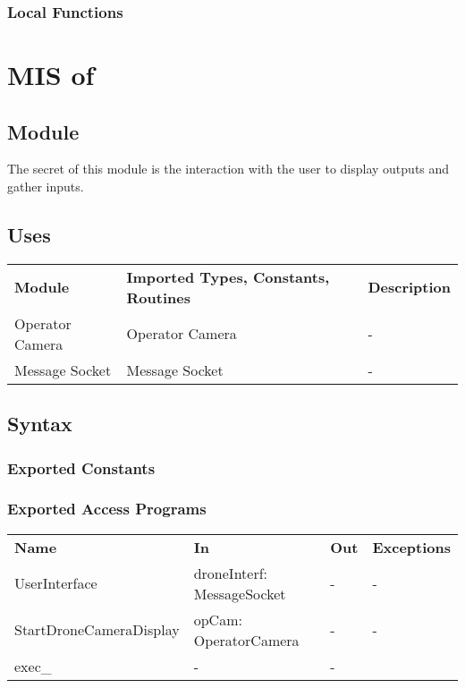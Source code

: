 \documentclass[12pt, titlepage]{article}
\begin{document}
\subsubsection{Local Functions}
\newpage

\section{MIS of } \label{MIS_USER_INTERFACE} 
\subsection{Module}
The secret of this module is the interaction with the user to display outputs and gather inputs.
\subsection{Uses}
\begin{center}
\begin{tabular}{p{2 cm} p{5cm} p{6.5cm} } 
\hline
\textbf{Module} & \textbf{Imported Types, Constants, Routines} & \textbf{Description} \\
Operator Camera & Operator Camera & - \\
Message Socket & Message Socket & - \\
\hline
\hline
\end{tabular}
\end{center}
\subsection{Syntax}
\subsubsection{Exported Constants}
\subsubsection{Exported Access Programs}
\begin{center}
\begin{tabular}{p{5.5cm} p{3.5cm} p{2.5cm} p{2cm}}
\hline
\textbf{Name} & \textbf{In} & \textbf{Out} & \textbf{Exceptions} \\
UserInterface & droneInterf: MessageSocket & - & - \\
StartDroneCameraDisplay & opCam: OperatorCamera & - & - \\
exec\_ & - & - \\
\hline
\hline
\end{tabular}
\end{center}
\end{document}
